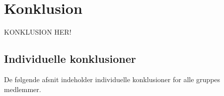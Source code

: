 \chapter{Konklusion}


KONKLUSION HER!


\section{Individuelle konklusioner}

De følgende afsnit indeholder individuelle konklusioner for alle gruppes medlemmer.












